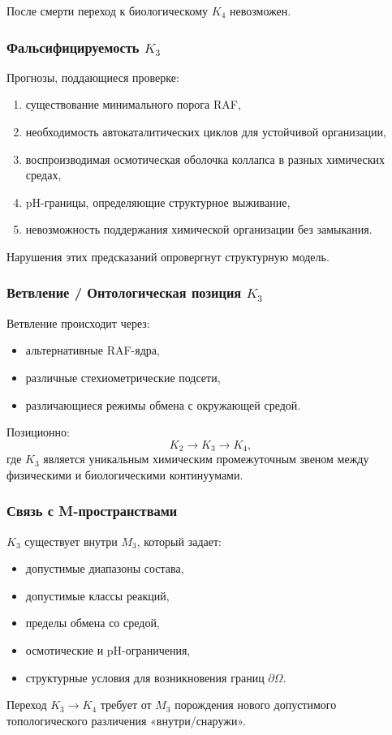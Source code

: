 После смерти переход к биологическому $K_4$ невозможен.

\subsubsection{Фальсифицируемость \texorpdfstring{$K_3$}{K_3}}

Прогнозы, поддающиеся проверке:
\begin{enumerate}
    \item существование минимального порога RAF,
    \item необходимость автокаталитических циклов для устойчивой организации,
    \item воспроизводимая осмотическая оболочка коллапса в разных химических
          средах,
    \item pH-границы, определяющие структурное выживание,
    \item невозможность поддержания химической организации без замыкания.
\end{enumerate}

Нарушения этих предсказаний опровергнут структурную модель.

\subsubsection{Ветвление / Онтологическая позиция \texorpdfstring{$K_3$}{K_3}}

Ветвление происходит через:
\begin{itemize}
    \item альтернативные RAF-ядра,
    \item различные стехиометрические подсети,
    \item различающиеся режимы обмена с окружающей средой.
\end{itemize}

Позиционно:
\[
K_2 \to K_3 \to K_4,
\]
где $K_3$ является уникальным химическим промежуточным звеном между
физическими и биологическими континуумами.

\subsubsection{Связь с M-пространствами}

$K_3$ существует внутри $M_3$, который задает:
\begin{itemize}
    \item допустимые диапазоны состава,
    \item допустимые классы реакций,
    \item пределы обмена со средой,
    \item осмотические и pH-ограничения,
    \item структурные условия для возникновения границ $\partial\Omega$.
\end{itemize}

Переход $K_3 \to K_4$ требует от $M_3$ порождения нового допустимого
топологического различения «внутри/снаружи».

